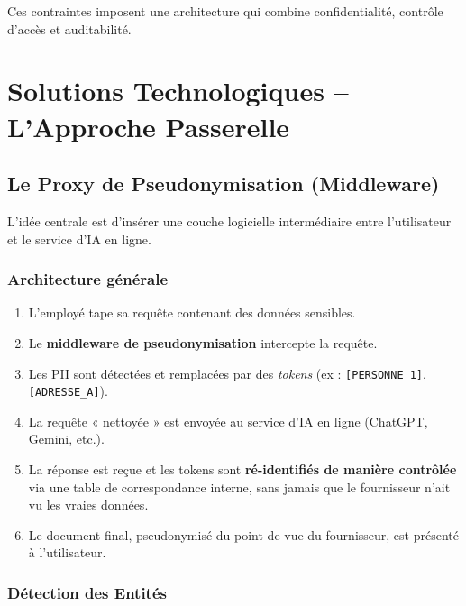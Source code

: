 \documentclass[12pt, a4paper]{report}
\begin{document}
Ces contraintes imposent une architecture qui combine confidentialité,
contrôle d'accès et auditabilité.

\newpage

\section{Solutions Technologiques -- L'Approche Passerelle}

\subsection{Le Proxy de Pseudonymisation (Middleware)}

L'idée centrale est d'insérer une couche logicielle intermédiaire entre
l'utilisateur et le service d'IA en ligne.

\subsubsection{Architecture générale}

\begin{enumerate}
  \item L'employé tape sa requête contenant des données sensibles.
  \item Le \textbf{middleware de pseudonymisation} intercepte la requête.
  \item Les PII sont détectées et remplacées par des \textit{tokens}
        (ex : \texttt{[PERSONNE\_1]}, \texttt{[ADRESSE\_A]}).
  \item La requête « nettoyée » est envoyée au service d'IA en ligne
        (ChatGPT, Gemini, etc.).
  \item La réponse est reçue et les tokens sont \textbf{ré-identifiés
        de manière contrôlée} via une table de correspondance interne,
        sans jamais que le fournisseur n'ait vu les vraies données.
  \item Le document final, pseudonymisé du point de vue du fournisseur,
        est présenté à l'utilisateur.
\end{enumerate}

\subsubsection{Détection des Entités}
\end{document}
